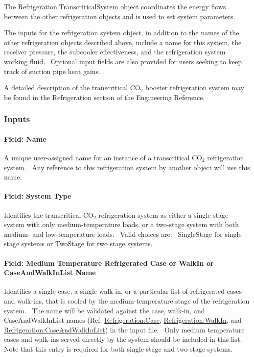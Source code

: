 The Refrigeration:TranscriticalSystem object coordinates the energy flows between the other refrigeration objects and is used to set system parameters.

The inputs for the refrigeration system object, in addition to the names of the other refrigeration objects described above, include a name for this system, the receiver pressure, the subcooler effectiveness, and the refrigeration system working fluid.~ Optional input fields are also provided for users seeking to keep track of suction pipe heat gains.

A detailed description of the transcritical CO\(_{2}\) booster refrigeration system may be found in the Refrigeration section of the Engineering Reference.

\subsubsection{Inputs}\label{inputs-4-026}

\paragraph{Field: Name}\label{field-name-5-019}

A unique user-assigned name for an instance of a transcritical CO\(_{2}\) refrigeration system.~ Any reference to this refrigeration system by another object will use this name.

\paragraph{Field: System Type}\label{field-system-type}

Identifies the transcritical CO\(_{2}\) refrigeration system as either a single-stage system with only medium-temperature loads, or a two-stage system with both medium- and low-temperature loads.~ Valid choices are:~ SingleStage for single stage systems or TwoStage for two stage systems.

\paragraph{Field: Medium Temperature Refrigerated Case or WalkIn or CaseAndWalkInList Name}\label{field-medium-temperature-refrigerated-case-or-walkin-or-caseandwalkinlist-name}

Identifies a single case, a single walk-in, or a particular list of refrigerated cases and walk-ins, that is cooled by the medium-temperature stage of the refrigeration system.~ The name will be validated against the case, walk-in, and CaseAndWalkInList names (Ref. \hyperref[refrigerationcase]{Refrigeration:Case}, \hyperref[refrigerationwalkin]{Refrigeration:WalkIn}, and \hyperref[refrigerationcaseandwalkinlist]{Refrigeration:CaseAndWalkInList}) in the input file.~ Only medium temperature cases and walk-ins served directly by the system should be included in this list.~ Note that this entry is required for both single-stage and two-stage systems.


